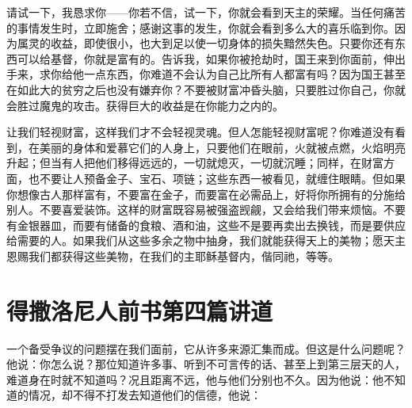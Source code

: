 请试一下，我恳求你——你若不信，试一下，你就会看到天主的荣耀。当任何痛苦的事情发生时，立即施舍；感谢这事的发生，你就会看到多么大的喜乐临到你。因为属灵的收益，即使很小，也大到足以使一切身体的损失黯然失色。只要你还有东西可以给基督，你就是富有的。告诉我，如果你被抢劫时，国王来到你面前，伸出手来，求你给他一点东西，你难道不会认为自己比所有人都富有吗？因为国王甚至在如此大的贫穷之后也没有嫌弃你？不要被财富冲昏头脑，只要胜过你自己，你就会胜过魔鬼的攻击。获得巨大的收益是在你能力之内的。\par

让我们轻视财富，这样我们才不会轻视灵魂。但人怎能轻视财富呢？你难道没有看到，在美丽的身体和爱慕它们的人身上，只要他们在眼前，火就被点燃，火焰明亮升起；但当有人把他们移得远远的，一切就熄灭，一切就沉睡；同样，在财富方面，也不要让人预备金子、宝石、项链；这些东西一被看见，就缠住眼睛。但如果你想像古人那样富有，不要富在金子，而要富在必需品上，好将你所拥有的分施给别人。不要喜爱装饰。这样的财富既容易被强盗觊觎，又会给我们带来烦恼。不要有金银器皿，而要有储备的食粮、酒和油，这些不是要再卖出去换钱，而是要供应给需要的人。如果我们从这些多余之物中抽身，我们就能获得天上的美物；愿天主恩赐我们都获得这些美物，在我们的主耶稣基督内，偕同祂，等等。\par



\section{得撒洛尼人前书第四篇讲道}

\par

\par

一个备受争议的问题摆在我们面前，它从许多来源汇集而成。但这是什么问题呢？他说：你怎么说？那位知道许多事、听到不可言传的话、甚至上到第三层天的人，难道身在时就不知道吗？况且距离不远，他与他们分别也不久。因为他说：他不知道的情况，却不得不打发去知道他们的信德，他说：\par

